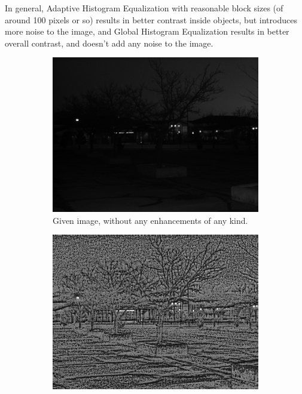 \documentclass[a4paper, landscape]{article}
\begin{document}
In general, Adaptive Histogram Equalization with reasonable block sizes (of around 100 pixels or so) results in better contrast inside objects, but introduces more noise to the image, and Global Histogram Equalization results in better overall contrast, and doesn't add any noise to the image.

\begin{figure}
    \centering
    \begin{subfigure}{0.32\linewidth}
        \centering
        \includegraphics[width=\linewidth]{LC1.png}
        \caption{Given image, without any enhancements of any kind.}
        \label{lc1_orig}
    \end{subfigure}
    \begin{subfigure}{0.32\linewidth}
        \centering
        \includegraphics[width=\linewidth, keepaspectratio]{smol_enhanced_LC1.png}

\end{subfigure}
\end{figure}
\end{document}
